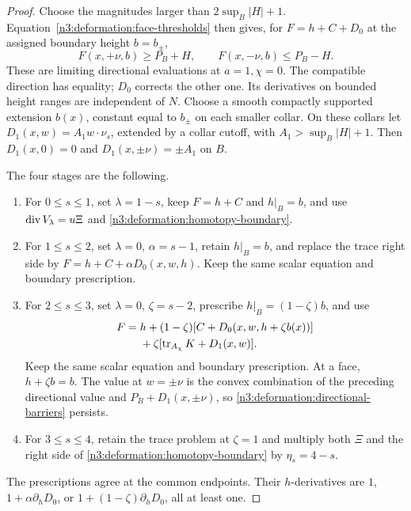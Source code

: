 \begin{proof}
Choose the magnitudes larger than $2\sup_B|H|+1$.
Equation~\eqref{n3:deformation:face-thresholds} then gives, for
$F=h+C+D_0$ at the assigned boundary height $b=b_\pm$,
\begin{equation}\label{n3:deformation:directional-barriers}
 F(x,+\nu,b)\ge P_B+H,\qquad F(x,-\nu,b)\le P_B-H.
\end{equation}
These are limiting directional evaluations at $a=1,\chi=0$.
The compatible direction has equality; $D_0$ corrects the other one.
Its derivatives on bounded height ranges are independent of $N$.
Choose a smooth compactly supported extension $b(x)$, constant equal
to $b_\pm$ on each smaller collar.
On these collars let $D_1(x,w)=A_1w\cdot\nu_s$, extended by a collar
cutoff, with $A_1>\sup_B|H|+1$.
Then $D_1(x,0)=0$ and $D_1(x,\pm\nu)=\pm A_1$ on $B$.

The four stages are the following.
\begin{enumerate}[label=\textup{(\roman*)}]
 \item For $0\le s\le1$, set $\lambda=1-s$, keep $F=h+C$ and $h|_B=b$,
 and use $\operatorname{div} V_\lambda=u\Xi$ and
 \eqref{n3:deformation:homotopy-boundary}.
 \item For $1\le s\le2$, set $\lambda=0$, $\alpha=s-1$, retain $h|_B=b$,
 and replace the trace right side by $F=h+C+\alpha D_0(x,w,h)$.
 Keep the same scalar equation and boundary prescription.
 \item For $2\le s\le3$, set $\lambda=0$, $\zeta=s-2$, prescribe
 $h|_B=(1-\zeta)b$, and use
 \begin{equation}\label{n3:deformation:interpolation-trace}
 \begin{split}
 F={}&h+(1-\zeta)[C+D_0(x,w,h+\zeta b(x))]\\
    &+\zeta[\operatorname{tr}_{A_\chi}K+D_1(x,w)].
 \end{split}
 \end{equation}
 Keep the same scalar equation and boundary prescription.
 At a face, $h+\zeta b=b$. The value at $w=\pm\nu$ is the convex
 combination of the preceding directional value and
 $P_B+D_1(x,\pm\nu)$, so \eqref{n3:deformation:directional-barriers} persists.
 \item For $3\le s\le4$, retain the trace problem at $\zeta=1$ and
 multiply both $\Xi$ and the right side of
 \eqref{n3:deformation:homotopy-boundary} by $\eta_s=4-s$.
\end{enumerate}
The prescriptions agree at the common endpoints.
Their $h$-derivatives are $1$, $1+\alpha\partial_hD_0$, or
$1+(1-\zeta)\partial_hD_0$, all at least one.


\end{proof}
